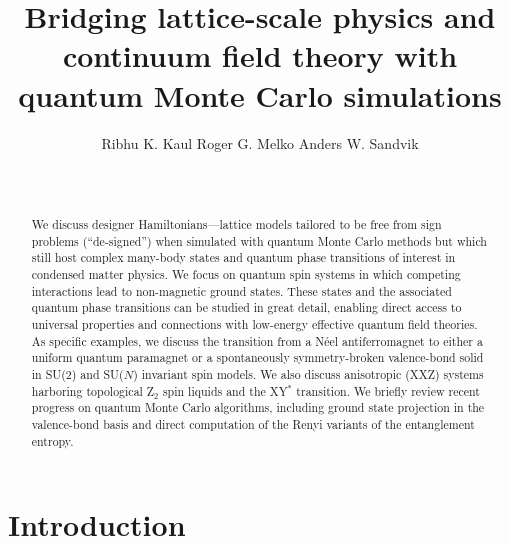 \documentclass[range]{ar2e}
\begin{document}




\title{Bridging lattice-scale physics and continuum field theory with 
quantum Monte Carlo simulations} 

\author{Ribhu K. Kaul
Roger G. Melko
Anders W. Sandvik
~~~~~~~~~~~~~~~~~~~~~~~~~~~~~~~~~~~~~~~~~~~~~~~~~~~~~~~~~~~~~~~~~~~~~~~~~~~~~~~~~~~~~~~~~~~~~~~~~~~~~~~~~~~~~
}

\begin{abstract}
We discuss designer Hamiltonians---lattice models tailored to be free from sign problems (``de-signed'') when simulated with quantum 
Monte Carlo methods but which still host complex  many-body states and quantum phase transitions of interest in condensed matter 
physics. We focus on quantum spin systems in which competing interactions lead to non-magnetic ground states. These states and the 
associated quantum phase transitions can be studied in great detail, enabling direct access to universal properties and connections 
with low-energy effective quantum field theories. As specific examples, we discuss the transition from a N\'eel antiferromagnet to 
either a uniform quantum paramagnet or a spontaneously symmetry-broken valence-bond solid in SU($2$) and SU($N$) invariant spin models. 
We also discuss anisotropic (XXZ) systems harboring topological Z$_2$ spin liquids and the XY$^*$ transition. We briefly review recent 
progress on quantum Monte Carlo algorithms, including ground state projection in the valence-bond basis and direct computation 
of the Renyi variants of the entanglement entropy.
\end{abstract}

\maketitle

\section{Introduction}
\label{sec:intro}
\end{document}
